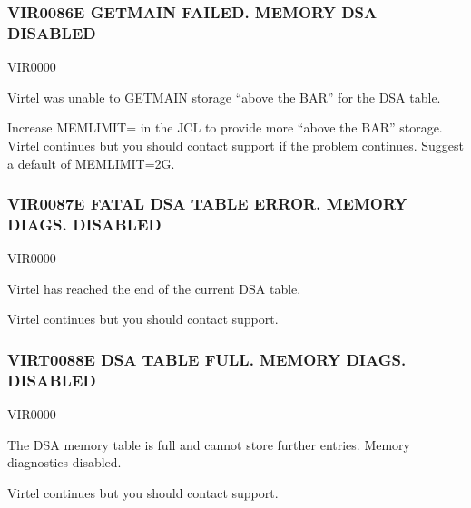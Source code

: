 \documentclass[letterpaper,10pt,english]{sphinxmanual}
\begin{document}
\subsubsection{VIR0086E GETMAIN FAILED. MEMORY DSA DISABLED}
\label{\detokenize{messages:vir0086e-getmain-failed-memory-dsa-disabled}}\begin{description}
\sphinxAtStartPar
VIR0000

\sphinxAtStartPar
Virtel was unable to GETMAIN storage “above the BAR” for the DSA table.

\sphinxAtStartPar
Increase MEMLIMIT= in the JCL to provide more “above the BAR” storage. Virtel continues but you should contact support if the problem continues. Suggest a default of MEMLIMIT=2G.

\end{description}


\subsubsection{VIR0087E FATAL DSA TABLE ERROR. MEMORY DIAGS. DISABLED}
\label{\detokenize{messages:vir0087e-fatal-dsa-table-error-memory-diags-disabled}}\begin{description}
\sphinxAtStartPar
VIR0000

\sphinxAtStartPar
Virtel has reached the end of the current DSA table.

\sphinxAtStartPar
Virtel continues but you should contact support.

\end{description}


\subsubsection{VIRT0088E DSA TABLE FULL. MEMORY DIAGS. DISABLED}
\label{\detokenize{messages:virt0088e-dsa-table-full-memory-diags-disabled}}\begin{description}
\sphinxAtStartPar
VIR0000

\sphinxAtStartPar
The DSA memory table is full and cannot store further entries. Memory diagnostics disabled.

\sphinxAtStartPar
Virtel continues but you should contact support.

\end{description}
\end{document}
